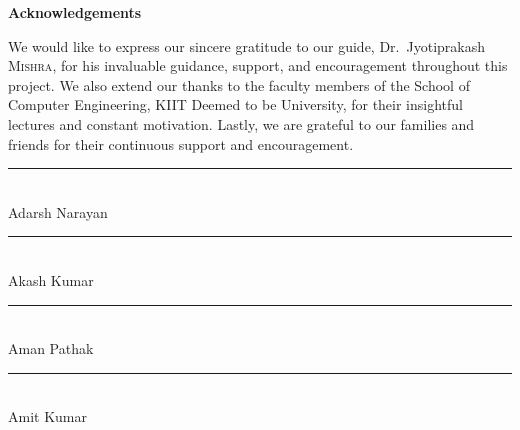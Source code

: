 \newpage
\begin{center}
	\Large \textbf{Acknowledgements}
\end{center}
\vspace{1cm}

\noindent
We would like to express our sincere gratitude to our guide, Dr.~Jyotiprakash \textsc{Mishra}, for his invaluable guidance, support, and encouragement throughout this project. We also extend our thanks to the faculty members of the School of Computer Engineering, KIIT Deemed to be University, for their insightful lectures and constant motivation. Lastly, we are grateful to our families and friends for their continuous support and encouragement.

\vspace{2cm}

\vspace{1cm}

\noindent
\rule{6cm}{0.4pt} \\ 
Adarsh Narayan \\[1cm]

\noindent
\rule{6cm}{0.4pt} \\ 
Akash Kumar \\[1cm]

\noindent
\rule{6cm}{0.4pt} \\ 
Aman Pathak \\[1cm]

\noindent
\rule{6cm}{0.4pt} \\ 
Amit Kumar
